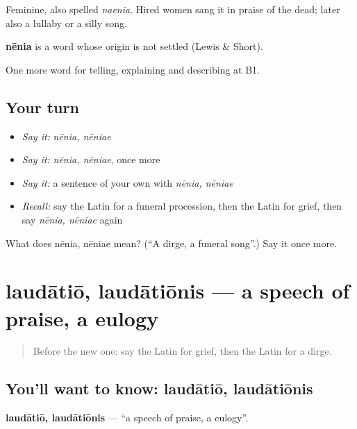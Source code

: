 Feminine, also spelled \emph{naenia}. Hired women sang it in praise of the dead; later also a lullaby or a silly song.

\begin{cousinweb}
\textbf{nēnia} is a word whose origin is not settled (Lewis \& Short).
\end{cousinweb}

\begin{grammarlens}[title={What you've built}]
One more word for telling, explaining and describing at B1.
\end{grammarlens}

\subsection*{Your turn}
\begin{itemize}
\raggedright
  \item \emph{Say it:} \emph{nēnia, nēniae}
  \item \emph{Say it:} \emph{nēnia, nēniae}, once more
  \item \emph{Say it:} a sentence of your own with \emph{nēnia, nēniae}
  \item \emph{Recall:} say the Latin for a funeral procession, then the Latin for grief, then say \emph{nēnia, nēniae} again
\end{itemize}

\begin{tcolorbox}[breakable,colback=teal!4,colframe=teal!35!black,title={Before you move on}]
What does nēnia, nēniae mean? (\textquotedblleft{}A dirge, a funeral song\textquotedblright{}.) Say it once more.
\end{tcolorbox}
\section[laudātiō, laudātiōnis]{laudātiō, laudātiōnis — a speech of praise, a eulogy}

\label{lesson:LA-C331-laudatio}



\begin{quote}
Before the new one: say the Latin for grief, then the Latin for a dirge.
\end{quote}

\subsection*{You'll want to know: laudātiō, laudātiōnis}
\textbf{laudātiō, laudātiōnis} — \textquotedblleft{}a speech of praise, a eulogy\textquotedblright{}.

